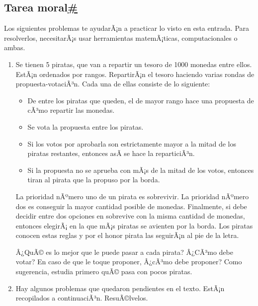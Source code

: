 \subsection{\texorpdfstring{Tarea
moral\hyperref[tarea-moral]{\#}}{Tarea moral\#}}\label{tarea-moral}

Los siguientes problemas te ayudarÃ¡n a practicar lo visto en esta
entrada. Para resolverlos, necesitarÃ¡s usar herramientas matemÃ¡ticas,
computacionales o ambas.

\begin{enumerate}
\item
  Se tienen 5 piratas, que van a repartir un tesoro de 1000 monedas
  entre ellos. EstÃ¡n ordenados por rangos. RepartirÃ¡n el tesoro
  haciendo varias rondas de propuesta-votaciÃ³n. Cada una de ellas
  consiste de lo siguiente:

  \begin{itemize}
  \item
    De entre los piratas que queden, el de mayor rango hace una
    propuesta de cÃ³mo repartir las monedas.
  \item
    Se vota la propuesta entre los piratas.
  \item
    Si los votos por aprobarla son estrictamente mayor a la mitad de los
    piratas restantes, entonces asÃ­ se hace la reparticiÃ³n.
  \item
    Si la propuesta no se aprueba con mÃ¡s de la mitad de los votos,
    entonces tiran al pirata que la propuso por la borda.
  \end{itemize}

  La prioridad nÃºmero uno de un pirata es sobrevivir. La prioridad
  nÃºmero dos es conseguir la mayor cantidad posible de monedas.
  Finalmente, si debe decidir entre dos opciones en sobrevive con la
  misma cantidad de monedas, entonces elegirÃ¡ en la que mÃ¡s piratas se
  avienten por la borda. Los piratas conocen estas reglas y por el honor
  pirata las seguirÃ¡n al pie de la letra.

  Â¿QuÃ© es lo mejor que le puede pasar a cada pirata? Â¿CÃ³mo debe
  votar? En caso de que le toque proponer, Â¿cÃ³mo debe proponer? Como
  sugerencia, estudia primero quÃ© pasa con pocos piratas.
\item
  Hay algunos problemas que quedaron pendientes en el texto. EstÃ¡n
  recopilados a continuaciÃ³n. ResuÃ©lvelos.


\end{enumerate}
